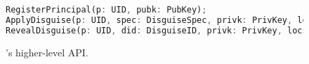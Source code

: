 \begin{figure}[t]
\begin{lstlisting}[language=Rust, style=rust]
RegisterPrincipal(p: UID, pubk: PubKey);
ApplyDisguise(p: UID, spec: DisguiseSpec, privk: PrivKey, locs: Vec<Locator>) -> (DisguiseID, Vec<Locator>);
RevealDisguise(p: UID, did: DisguiseID, privk: PrivKey, locs: Vec<Locator>);
\end{lstlisting}
\caption{\sys's higher-level API.}
\label{f:api-high}
\end{figure}

